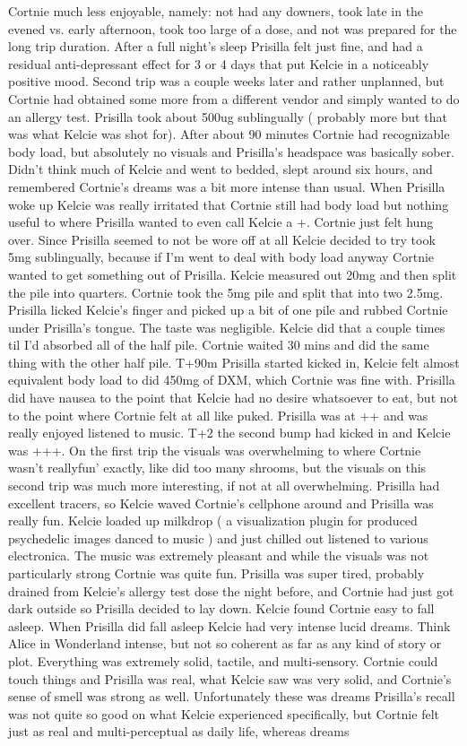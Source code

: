 \documentclass[12pt]{book}
\begin{document}
Cortnie much less enjoyable, namely: not had any downers, took late in the evened vs. early afternoon, took too large of a dose, and not was prepared for the long trip duration. After a full night's sleep Prisilla felt just fine, and had a residual anti-depressant effect for 3 or 4 days that put Kelcie in a noticeably positive mood. Second trip was a couple weeks later and rather unplanned, but Cortnie had obtained some more from a different vendor and simply wanted to do an allergy test. Prisilla took about 500ug sublingually ( probably more but that was what Kelcie was shot for). After about 90 minutes Cortnie had recognizable body load, but absolutely no visuals and Prisilla's headspace was basically sober. Didn't think much of Kelcie and went to bedded, slept around six hours, and remembered Cortnie's dreams was a bit more intense than usual. When Prisilla woke up Kelcie was really irritated that Cortnie still had body load but nothing useful to where Prisilla wanted to even call Kelcie a +. Cortnie just felt hung over. Since Prisilla seemed to not be wore off at all Kelcie decided to try took 5mg sublingually, because if I'm went to deal with body load anyway Cortnie wanted to get something out of Prisilla. Kelcie measured out 20mg and then split the pile into quarters. Cortnie took the 5mg pile and split that into two 2.5mg. Prisilla licked Kelcie's finger and picked up a bit of one pile and rubbed Cortnie under Prisilla's tongue. The taste was negligible. Kelcie did that a couple times til I'd absorbed all of the half pile. Cortnie waited 30 mins and did the same thing with the other half pile. T+90m Prisilla started kicked in, Kelcie felt almost equivalent body load to did 450mg of DXM, which Cortnie was fine with. Prisilla did have nausea to the point that Kelcie had no desire whatsoever to eat, but not to the point where Cortnie felt at all like puked. Prisilla was at ++ and was really enjoyed listened to music. T+2 the second bump had kicked in and Kelcie was +++. On the first trip the visuals was overwhelming to where Cortnie wasn't reallyfun' exactly, like did too many shrooms, but the visuals on this second trip was much more interesting, if not at all overwhelming. Prisilla had excellent tracers, so Kelcie waved Cortnie's cellphone around and Prisilla was really fun. Kelcie loaded up milkdrop ( a visualization plugin for produced psychedelic images danced to music ) and just chilled out listened to various electronica. The music was extremely pleasant and while the visuals was not particularly strong Cortnie was quite fun. Prisilla was super tired, probably drained from Kelcie's allergy test dose the night before, and Cortnie had just got dark outside so Prisilla decided to lay down. Kelcie found Cortnie easy to fall asleep. When Prisilla did fall asleep Kelcie had very intense lucid dreams. Think Alice in Wonderland intense, but not so coherent as far as any kind of story or plot. Everything was extremely solid, tactile, and multi-sensory. Cortnie could touch things and Prisilla was real, what Kelcie saw was very solid, and Cortnie's sense of smell was strong as well. Unfortunately these was dreams Prisilla's recall was not quite so good on what Kelcie experienced specifically, but Cortnie felt just as real and multi-perceptual as daily life, whereas dreams 
\end{document}
